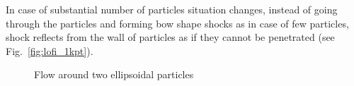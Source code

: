In case of substantial number of particles situation changes, instead of going through the particles and forming bow shape shocks as in case of few particles, shock reflects from the wall of particles as if they cannot be penetrated (see Fig.~\ref{fig:lofi_1kpt}).
\begin{figure}[t]
\begin{minipage}{0.5\linewidth}
\end{minipage}
\begin{minipage}{0.5\linewidth}
\end{minipage}
\caption{Flow around two ellipsoidal particles} \label{fig:lofi_2pt}
\end{figure}

